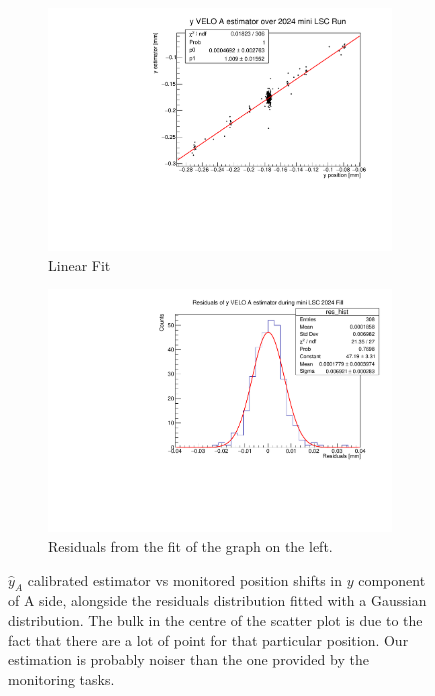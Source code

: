 \begin{figure}
    \centering
    \begin{subfigure}{0.48\textwidth}
    \includegraphics[width=\linewidth]{figures/yVeloA_fit_comparison.pdf}
    \caption{Linear Fit}\label{fig:yAfit_comparison}
    \end{subfigure}
    \begin{subfigure}{0.48\textwidth}
    \includegraphics[width=\linewidth]{figures/yVeloA_res_comparison.pdf}
    \caption{Residuals from the fit of the graph on the left. }\label{fig:yAres_comparison}
    \end{subfigure}
    \caption{$\hat{y}_{A}$ calibrated estimator vs monitored position shifts in $y$ component of A side, alongside the residuals distribution fitted with a Gaussian distribution. The bulk in the centre of the scatter plot is due to the fact that there are a lot of point for that particular position. Our estimation is probably noiser than the one provided by the monitoring tasks. }
    \label{fig:yA_comparison}
\end{figure}

